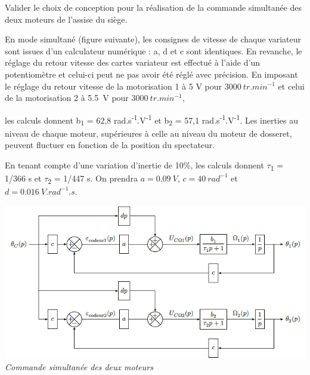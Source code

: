 \documentclass[10pt,fleqn]{article} %
\begin{document}
\begin{multicols}{2}
\begin{obj}

Valider le choix de conception pour la réalisation de la commande simultanée des deux moteurs de l'assise du siège.
\end{obj}

En mode simultané (figure suivante), les consignes de vitesse de chaque
variateur sont issues d'un calculateur numérique : a, d et c sont
identiques. En revanche, le réglage du retour vitesse des cartes
variateur est effectué à l'aide d'un potentiomètre et celui-ci peut ne
pas avoir été réglé avec précision. En imposant le réglage du retour
vitesse de la motorisation 1 à 5 V pour $\SI{3000}{tr.min^{-1}}$
et celui de la motorisation 2 à \SI{5,5}{V} pour $\SI{3000}{tr. min^{-1}}$,

les calculs donnent b\textsubscript{1} = 62,8
rad.s\textsuperscript{-1}.V\textsuperscript{-1} et b\textsubscript{2} =
57,1 rad.s\textsuperscript{-1}.V\textsuperscript{-1}. Les inerties au
niveau de chaque moteur, supérieures à celle au niveau du moteur de
dosseret, peuvent fluctuer en fonction de la position du spectateur.

En tenant compte d'une variation d'inertie de 10\%, les calculs donnent
$\tau$\textsubscript{1} = 1/366 s et $\tau$\textsubscript{2} = 1/447 s. On prendra
$a =\SI{0,09}{V}$, $c =\SI{40}{rad^{-1}}$ et $d = \SI{0,016}{V.rad^{-1}.s}$.


\begin{center}
\includegraphics[width=1.0\linewidth]{images/image20.png}
\textit{Commande simultanée des deux moteurs \label{fig19}}
\end{center}



\end{multicols}
\end{document}
